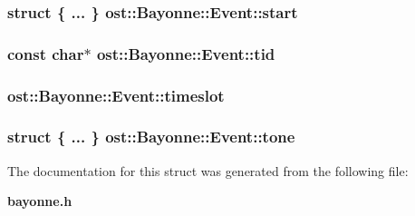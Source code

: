 \subsubsection[{start}]{\setlength{\rightskip}{0pt plus 5cm}struct \{ ... \} 	 {\bf ost::Bayonne::Event::start}}\label{structost_1_1_bayonne_1_1_event_a6c689bd8776efaa100576925256bb465}
\subsubsection[{tid}]{\setlength{\rightskip}{0pt plus 5cm}const char$\ast$ {\bf ost::Bayonne::Event::tid}}\label{structost_1_1_bayonne_1_1_event_a216b44e913fe59b3f32b27c071f385cd}
\subsubsection[{timeslot}]{ {\bf ost::Bayonne::Event::timeslot}}\label{structost_1_1_bayonne_1_1_event_a82c37d88d69d0d712a43480e028b1f12}
\subsubsection[{tone}]{\setlength{\rightskip}{0pt plus 5cm}struct \{ ... \} 	 {\bf ost::Bayonne::Event::tone}}\label{structost_1_1_bayonne_1_1_event_a6e6b60ab72d5e9bdd0ff08523b65a232}


The documentation for this struct was generated from the following file:\begin{DoxyCompactItemize}
\item 
{\bf bayonne.h}\end{DoxyCompactItemize}
